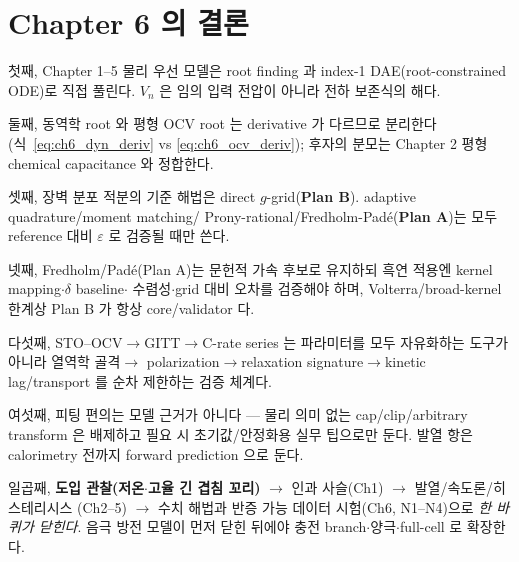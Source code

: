 \documentclass[11pt,a4paper]{article}
\begin{document}
\section{Chapter 6 의 결론}\label{sec:ch6_concl}
첫째, Chapter 1--5 물리 우선 모델은 root finding 과 index-1 DAE(root-constrained ODE)로 직접 풀린다. $V_n$ 은
임의 입력 전압이 아니라 전하 보존식의 해다.

둘째, 동역학 root 와 평형 OCV root 는 derivative 가 다르므로 분리한다(식~\eqref{eq:ch6_dyn_deriv} vs
\eqref{eq:ch6_ocv_deriv}); 후자의 분모는 Chapter 2 평형 chemical capacitance 와 정합한다.

셋째, 장벽 분포 적분의 기준 해법은 direct $g$-grid(\textbf{Plan B}). adaptive quadrature/moment matching/
Prony-rational/Fredholm-Padé(\textbf{Plan A})는 모두 reference 대비 $\varepsilon$ 로 검증될 때만 쓴다.

넷째, Fredholm/Padé(Plan A)는 문헌적 가속 후보로 유지하되 흑연 적용엔 kernel mapping$\cdot\delta$ baseline$\cdot$
수렴성$\cdot$grid 대비 오차를 검증해야 하며, Volterra/broad-kernel 한계상 Plan B 가 항상 core/validator 다.

다섯째, STO--OCV$\to$GITT$\to$C-rate series 는 파라미터를 모두 자유화하는 도구가 아니라 열역학 골격$\to$
polarization$\to$relaxation signature$\to$kinetic lag/transport 를 순차 제한하는 검증 체계다.

여섯째, 피팅 편의는 모델 근거가 아니다 — 물리 의미 없는 cap/clip/arbitrary transform 은 배제하고 필요 시
초기값/안정화용 실무 팁으로만 둔다. 발열 항은 calorimetry 전까지 forward prediction 으로 둔다.

일곱째, \textbf{도입 관찰(저온$\cdot$고율 긴 겹침 꼬리)} $\to$ 인과 사슬(Ch1) $\to$ 발열/속도론/히스테리시스
(Ch2--5) $\to$ 수치 해법과 반증 가능 데이터 시험(Ch6, N1--N4)으로 \emph{한 바퀴가 닫힌다}. 음극 방전 모델이
먼저 닫힌 뒤에야 충전 branch$\cdot$양극$\cdot$full-cell 로 확장한다.
\end{document}
